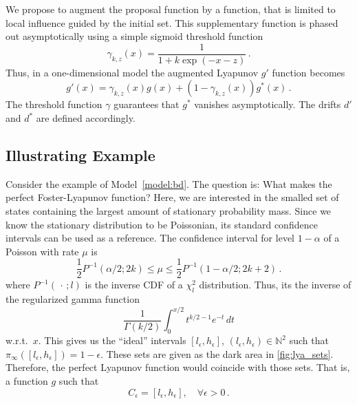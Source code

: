 We propose to augment the proposal function by a function, that is limited to local influence guided by the initial set.
This supplementary function is phased out asymptotically using a simple sigmoid threshold function
\begin{equation}\label{eq:threshold}
  \gamma_{k,z}(x) = \frac{1}{1+k\exp(-x - z)}\,.
\end{equation}
Thus, in a one-dimensional model the augmented Lyapunov $g'$ function becomes
\begin{equation}\label{eq:thres_lyapunov}
    g'(x) = \gamma_{k,z}(x) g(x) + (1 - \gamma_{k,z}(x)) g^*(x)\,.
\end{equation}
The threshold function $\gamma$ guarantees that $g^*$ vanishes asymptotically.
The drifts $d'$ and $d^*$ are defined accordingly.

\subsection{Illustrating Example}
Consider the example of Model~\ref{model:bd}.
The question is: What makes the perfect Foster-Lyapunov function?
Here, we are interested in the smalled set of states containing the largest amount of stationary probability mass.
Since we know the stationary distribution to be Poissonian, its standard confidence intervals can be used as a reference.
The confidence interval for level $1-\alpha$ of a Poisson with rate $\mu$ is
\[
\frac{1}{2}P^{-1}(\alpha/2; 2k)\le\mu\leq\frac{1}{2}P^{-1}(1-\alpha/2;{2k+2})\,.
\]
where $P^{-1}(\,\cdot\,; l)$ is the inverse \ac{CDF} of a $\chi^2_{l}$ distribution.
Thus, its the inverse of the regularized gamma function
\[
	\frac{1}{\Gamma(k/2)}\int_0^{x/2} t^{k/2 - 1} e^{-t}\,dt
\]
w.r.t.\ $x$.
This gives us the ``ideal'' intervals $[l_{\epsilon},h_{\epsilon}]$, $(l_{\epsilon},h_{\epsilon})\in\mathbb{N}^2$ such that $\pi_{\infty}([l_{\epsilon},h_{\epsilon}])=1-\epsilon$.
These sets are given as the dark area in \autoref{fig:lya_sets}.
Therefore, the perfect Lyapunov function would coincide with those sets. That is,
a function $g$ such that
\[
	C_{\epsilon}
	=
	\left[l_{\epsilon}, h_{\epsilon}\right], \quad \forall\epsilon> 0\,.
\]

